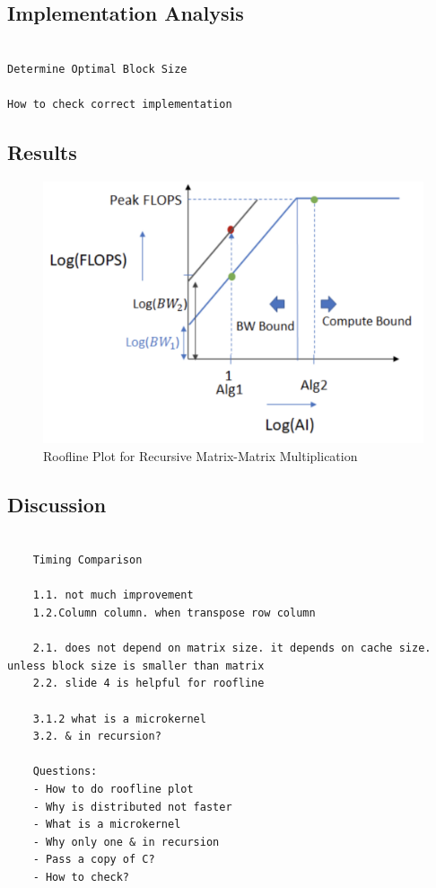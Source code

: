 \documentclass{article}
\begin{document}
\subsection{Implementation Analysis}
\begin{verbatim}

Determine Optimal Block Size

How to check correct implementation

\end{verbatim}

\subsection{Results}
\begin{figure}[!htb]
    \centering
    \includegraphics[width=0.8\linewidth]{roofline_plot.png}
    \caption{Roofline Plot for Recursive Matrix-Matrix Multiplication}
\end{figure}

\subsection{Discussion}

\begin{verbatim}

    Timing Comparison

    1.1. not much improvement
    1.2.Column column. when transpose row column

    2.1. does not depend on matrix size. it depends on cache size. unless block size is smaller than matrix
    2.2. slide 4 is helpful for roofline

    3.1.2 what is a microkernel
    3.2. & in recursion?

    Questions:
    - How to do roofline plot
    - Why is distributed not faster
    - What is a microkernel
    - Why only one & in recursion
    - Pass a copy of C?
    - How to check?

\end{verbatim}
\end{document}
